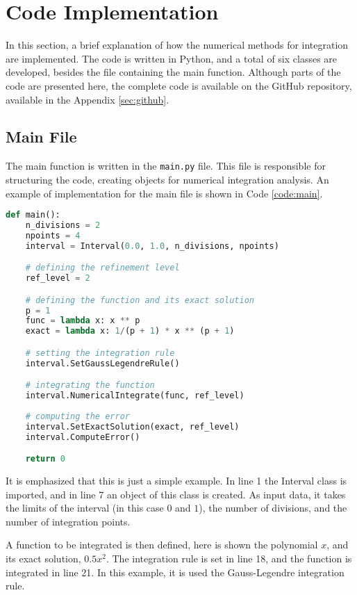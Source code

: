 \section{Code Implementation} \label{sec:code-implementation}
In this section, a brief explanation of how the numerical methods for integration are implemented. The code is written in Python, and a total of six classes are developed, besides the file containing the main function. Although parts of the code are presented here, the complete code is available on the GitHub repository, available in the Appendix \ref{sec:github}.

\subsection{Main File}
The main function is written in the \texttt{main.py} file. This file is responsible for structuring the code, creating objects for numerical integration analysis. An example of implementation for the main file is shown in Code \ref{code:main}.
\begin{lstlisting}[language=Python, caption={Main function.}, label={code:main}] 
def main():
    n_divisions = 2
    npoints = 4
    interval = Interval(0.0, 1.0, n_divisions, npoints)

    # defining the refinement level
    ref_level = 2

    # defining the function and its exact solution
    p = 1
    func = lambda x: x ** p
    exact = lambda x: 1/(p + 1) * x ** (p + 1)

    # setting the integration rule
    interval.SetGaussLegendreRule()

    # integrating the function
    interval.NumericalIntegrate(func, ref_level)
    
    # computing the error
    interval.SetExactSolution(exact, ref_level)
    interval.ComputeError()

    return 0
\end{lstlisting}

It is emphasized that this is just a simple example. In line 1 the Interval class is imported, and in line 7 an object of this class is created. As input data, it takes the limits of the interval (in this case $0$ and $1$), the number of divisions, and the number of integration points. 

A function to be integrated is then defined, here is shown the polynomial $x$, and its exact solution, $0.5x^2$. The integration rule is set in line 18, and the function is integrated in line 21. In this example, it is used the Gauss-Legendre integration rule. 

